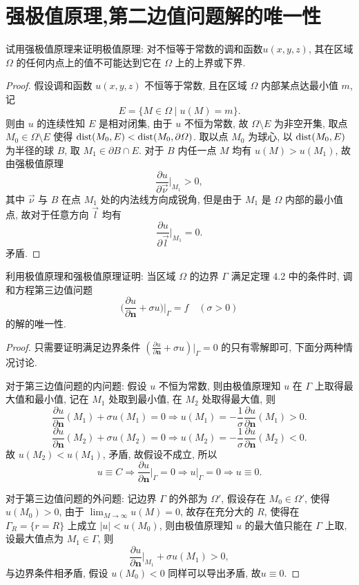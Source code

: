 \section{强极值原理,第二边值问题解的唯一性}

\begin{exercise}
  试用强极值原理来证明极值原理: 对不恒等于常数的调和函数$u(x,y,z)$,
  其在区域 $\varOmega$ 的任何内点上的值不可能达到它在 $\varOmega$ 上的上界或下界.
\end{exercise}

\begin{proof}
  假设调和函数 $u(x,y,z)$ 不恒等于常数, 且在区域 $\varOmega$ 内部某点达最小值 $m$, 记
  \[E = \{ M\in\varOmega \mid u(M) = m\}.\]
  则由 $u$ 的连续性知 $E$ 是相对闭集, 由于 $u$ 不恒为常数, 故 $\varOmega\setminus E$ 为非空开集,
  取点 $M_0\in\varOmega\setminus E$ 使得 $\operatorname{dist}(M_0, E) < \operatorname{dist}(M_0, \partial\varOmega)$.
  取以点 $M_0$ 为球心, 以 $\operatorname{dist}(M_0, E)$ 为半径的球 $B$, 取 $M_1\in \partial B\cap E$.
  对于 $B$ 内任一点 $M$ 均有 $u(M)>u(M_1)$, 故由强极值原理
  \[\frac{\partial u}{\partial\vec{\nu}}\bigg|_{M_1} > 0,\]
  其中 $\vec{\nu}$ 与 $B$ 在点 $M_1$ 处的内法线方向成锐角,
  但是由于 $M_1$ 是 $\varOmega$ 内部的最小值点, 故对于任意方向 $\vec{l}$ 均有
  \[\frac{\partial u}{\partial\vec{l}}\bigg|_{M_1} = 0.\]
  矛盾.
\end{proof}


\begin{exercise}
  利用极值原理和强极值原理证明: 当区域 $\varOmega$ 的边界 $\varGamma$
  满足定理 4.2 中的条件时, 调和方程第三边值问题
  \[\biggl(\frac{\partial u}{\partial \bm{n}} + \sigma u\biggr)\bigg|_{\varGamma}
    = f \quad (\sigma>0)\]
  的解的唯一性.
\end{exercise}

\begin{proof}
  只需要证明满足边界条件 $(\frac{\partial u}{\partial\bm{n}}+\sigma u)|_{\varGamma}=0$ 的只有零解即可,
  下面分两种情况讨论.

  对于第三边值问题的内问题: 假设 $u$ 不恒为常数, 则由极值原理知 $u$ 在 $\varGamma$ 上取得最大值和最小值,
  记在 $M_1$ 处取到最小值, 在 $M_2$ 处取得最大值, 则
  \[\frac{\partial u}{\partial\bm{n}}(M_1) + \sigma u(M_1) = 0
    \Rightarrow u(M_1) = -\frac{1}{\sigma}\frac{\partial u}{\partial\bm{n}}(M_1)>0.\]
  \[\frac{\partial u}{\partial\bm{n}}(M_2) + \sigma u(M_2) = 0
    \Rightarrow u(M_2) = -\frac{1}{\sigma}\frac{\partial u}{\partial\bm{n}}(M_2)<0.\]
  故 $u(M_2)<u(M_1)$, 矛盾, 故假设不成立, 所以
  \[u\equiv C\Rightarrow\frac{\partial u}{\partial\bm{n}}\bigg|_{\varGamma} = 0
    \Rightarrow u|_{\varGamma}=0\Rightarrow u\equiv 0.\]
  
  对于第三边值问题的外问题: 记边界 $\varGamma$ 的外部为 $\varOmega'$,
  假设存在 $M_0\in\varOmega'$, 使得 $u(M_0)>0$, 由于 $\lim_{M\to\infty}u(M)=0$,
  故存在充分大的 $R$, 使得在 $\varGamma_R = \{r=R\}$ 上成立 $|u|<u(M_0)$,
  则由极值原理知 $u$ 的最大值只能在 $\varGamma$ 上取, 设最大值点为 $M_1\in\varGamma$, 则
  \[\frac{\partial u}{\partial\bm{n}}\bigg|_{M_1}+\sigma u(M_1)>0,\]
  与边界条件相矛盾, 假设 $u(M_0)<0$ 同样可以导出矛盾, 故$u\equiv 0$.
\end{proof}


